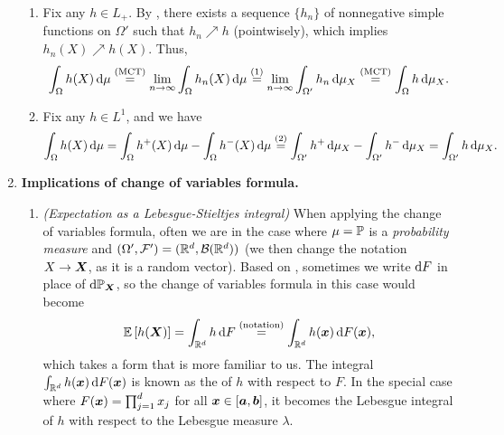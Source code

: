 \begin{enumerate}
\begin{pf}
\begin{enumerate}[label={(\arabic*)}]
\item Fix any \(h\in L_{+}\). By , there exists a sequence
\(\{h_n\}\) of nonnegative simple functions on \(\Omega'\) such that
\(h_n\nearrow h\) (pointwisely), which implies \(h_n(X)\nearrow h(X)\). Thus,
\[
\int_{\Omega}^{}h(X)\odif{\mu}
\overset{\text{(MCT)}}{=}\lim_{n\to\infty}\int_{\Omega}^{}h_n(X)\odif{\mu}
\overset{(1)}{=}\lim_{n\to\infty}\int_{\Omega'}^{}h_n\odif{\mu_X}
\overset{\text{(MCT)}}{=}
\int_{\Omega}^{}h\odif{\mu_X}.
\]
\item Fix any \(h\in L^{1}\), and we have
\[
\int_{\Omega}^{}h(X)\odif{\mu}=
\int_{\Omega}^{}h^{+}(X)\odif{\mu}
-\int_{\Omega}^{}h^{-}(X)\odif{\mu}
\overset{(2)}{=}
\int_{\Omega'}^{}h^{+}\odif{\mu_X}
-\int_{\Omega'}^{}h^{-}\odif{\mu_X}
=\int_{\Omega'}^{}h\odif{\mu_X}.
\]
\end{enumerate}
\end{pf}
\item \textbf{Implications of change of variables formula.}
\begin{enumerate}
\item \emph{(Expectation as a Lebesgue-Stieltjes integral)}
\label{it:lebesgue-stieljes-int} When applying the change of variables formula,
often we are in the case where \(\mu=\mathbb{P}\) is a \emph{probability measure} and
\((\Omega',\mathcal{F}')=(\mathbb{R}^{d},\mathcal{B}(\mathbb{R}^d))\) (we then change the
notation \(X\to\bm{X}\), as it is a random vector). Based on
, sometimes we write \(\odif{F}\) in place of
\(\odif{\pr_{\vect{X}}}\), so the change of variables formula in this case
would become
\[
\expv{h(\vect{X})}=\int_{\R^d}^{}h\odif{F}\overset{\text{(notation)}}{=}\int_{\R^d}^{}h(\vect{x})\odif{F(\vect{x})},
\]
which takes a form that is more familiar to us. The integral
\(\int_{\R^d}^{}h(\vect{x})\odif{F(\vect{x})}\) is known as the
 of \(h\) with respect to \(F\).
In the special case where \(F(\bm{x})=\prod_{j=1}^{d}x_j\) for all
\(\bm{x}\in[\bm{a},\bm{b}]\), it becomes the Lebesgue integral of \(h\)
with respect to the Lebesgue measure \(\lambda\).


\end{enumerate}
\end{enumerate}
